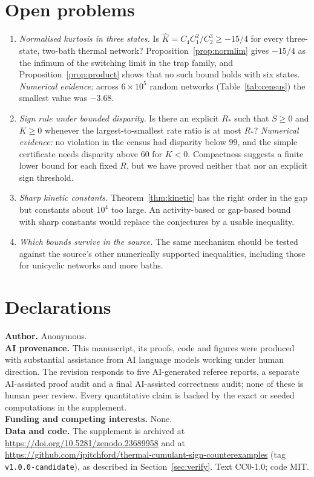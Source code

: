 \documentclass[11pt,a4paper]{article}
\theoremstyle{remark}\newtheorem{remark}[theorem]{Remark}
\begin{document}
\section{Open problems}\label{sec:open}
\begin{enumerate}[nosep]
\item \emph{Normalised kurtosis in three states.} Is $\hat K=C_4C_1^2/C_2^3\ge-15/4$ for every three-state, two-bath thermal network? Proposition~\ref{prop:normlim} gives $-15/4$ as the infimum of the switching limit in the trap family, and Proposition~\ref{prop:product} shows that no such bound holds with six states. \emph{Numerical evidence:} across $6\times10^5$ random networks (Table~\ref{tab:census}) the smallest value was $-3.68$.
\item \emph{Sign rule under bounded disparity.} Is there an explicit $R_*$ such that $S\ge0$ and $K\ge0$ whenever the largest-to-smallest rate ratio is at most $R_*$? \emph{Numerical evidence:} no violation in the census had disparity below $99$, and the simple certificate needs disparity above $60$ for $K<0$. Compactness suggests a finite lower bound for each fixed $R$, but we have proved neither that nor an explicit sign threshold.
\item \emph{Sharp kinetic constants.} Theorem~\ref{thm:kinetic} has the right order in the gap but constants about $10^4$ too large. An activity-based or gap-based bound with sharp constants would replace the conjectures by a usable inequality.
\item \emph{Which bounds survive in the source.} The same mechanism should be tested against the source's other numerically supported inequalities, including those for unicyclic networks and more baths.
\end{enumerate}

\section*{Declarations}\sloppy
\textbf{Author.} Anonymous.\\
\textbf{AI provenance.} This manuscript, its proofs, code and figures were produced with substantial assistance from AI language models working under human direction. The revision responds to five AI-generated referee reports, a separate AI-assisted proof audit and a final AI-assisted correctness audit; none of these is human peer review. Every quantitative claim is backed by the exact or seeded computations in the supplement.\\
\textbf{Funding and competing interests.} None.\\
\textbf{Data and code.} The supplement is archived at \url{https://doi.org/10.5281/zenodo.23689958} and at \url{https://github.com/ipitchford/thermal-cumulant-sign-counterexamples} (tag \texttt{v1.0.0-candidate}), as described in Section~\ref{sec:verify}. Text CC0-1.0; code MIT.
\end{document}
